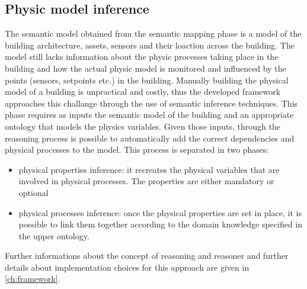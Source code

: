 \subsection{Physic model inference}
The semantic model obtained from the semantic mapping phase is a model of the building architecture, assets, sensors and their loaction across the building. The model still lacks information about the physic processes taking place in the building and how the actual physic model is monitored and influenced by the points (sensors, setpoints etc.) in the building. Manually building the physical model of a building is unpractical and costly, thus the developed framework approaches this challange through the use of semantic inference techniques. This phase requires as inputs the semantic model of the building and an appropriate ontology that models the physics variables. Given those inputs, through the reasoning process is possible to automatically add the correct dependencies and physical processes to the model. This process is separated in two phases:
\begin{itemize}
  \item physical properties inference: it recreates the physical variables that are involved in physical processes. The properties are either mandatory or optional
  \item physical processes inference: once the physical properties are set in place, it is possible to link them together according to the domain knowledge specified in the upper ontology.
\end{itemize}
Further informations about the concept of reasoning and reasoner and further details about implementation choices for this approach are given in \autoref{ch:framework}.

